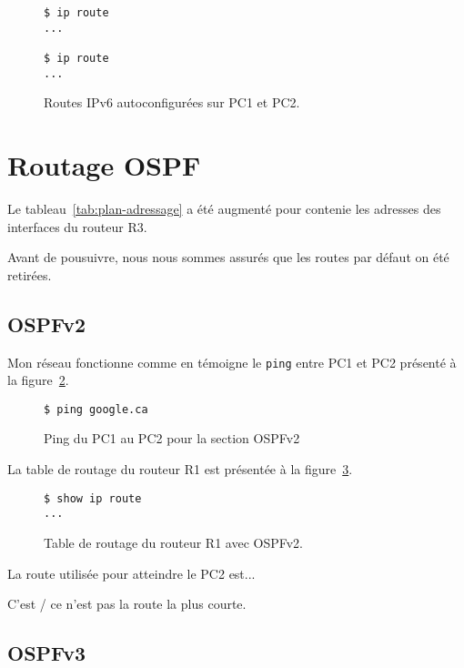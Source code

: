 \documentclass[]{article}
\begin{document}
\begin{figure} 
      \centering
      \begin{lstlisting}
$ ip route
...

$ ip route
...
      \end{lstlisting}
      \caption[]{Routes IPv6 autoconfigurées sur PC1 et PC2.}
      \label{fig:ipv6-routes-pc1-pc2}
\end{figure}

\section*{Routage OSPF}

Le tableau~\ref{tab:plan-adressage} a été augmenté pour contenie les adresses des interfaces
du routeur R3.

Avant de pousuivre, nous nous sommes assurés que les routes par défaut on été retirées.

\subsection*{OSPFv2}

Mon réseau fonctionne comme en témoigne le \texttt{ping} entre PC1 et PC2 présenté à la figure~\ref{fig:ping-pc1-pc2-ospfv2}.

\begin{figure} 
      \centering
      \begin{lstlisting}
$ ping google.ca
      \end{lstlisting}
      \caption[]{Ping du PC1 au PC2 pour la section OSPFv2}
      \label{fig:ping-pc1-pc2-ospfv2}
\end{figure}

La table de routage du routeur R1 est présentée à la figure~\ref{fig:ospfv2-routes-r1}.

\begin{figure} 
      \centering
      \begin{lstlisting}
$ show ip route
...
      \end{lstlisting}
      \caption[]{Table de routage du routeur R1 avec OSPFv2.}
      \label{fig:ospfv2-routes-r1}
\end{figure}

La route utilisée pour atteindre le PC2 est...

C'est / ce n'est pas la route la plus courte.

\subsection*{OSPFv3}
\end{document}
